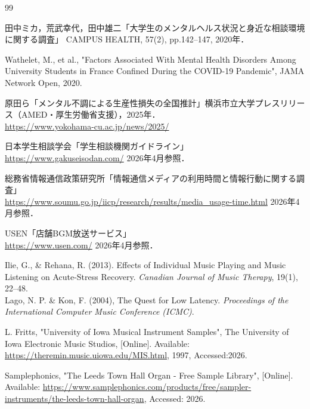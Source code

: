 \documentclass[lualatex,book,paper=a4paper,jafontsize=11.5pt,jafontscale=1.05]{jlreq}
\begin{document}
\begin{thebibliography}{99}

 田中ミカ，荒武幸代，田中雄二「大学生のメンタルヘルス状況と身近な相談環境に関する調査」
CAMPUS HEALTH, 57(2), pp.142--147, 2020年．

 Wathelet, M., et al., "Factors Associated With Mental Health Disorders Among University Students in France Confined During the COVID-19 Pandemic", JAMA Network Open, 2020.

 原田ら「メンタル不調による生産性損失の全国推計」横浜市立大学プレスリリース（AMED・厚生労働省支援），2025年．\\
\url{https://www.yokohama-cu.ac.jp/news/2025/}

 日本学生相談学会「学生相談機関ガイドライン」\\
\url{https://www.gakuseisodan.com/} 2026年4月参照．

 総務省情報通信政策研究所「情報通信メディアの利用時間と情報行動に関する調査」\\
\url{https://www.soumu.go.jp/iicp/research/results/media_usage-time.html} 2026年4月参照．

 USEN「店舗BGM放送サービス」\\
\url{https://www.usen.com/} 2026年4月参照．

 Ilie, G., \& Rehana, R. (2013). Effects of Individual Music Playing and Music Listening on Acute-Stress Recovery. \textit{Canadian Journal of Music Therapy}, 19(1), 22--48.\\

 Lago, N. P. \& Kon, F. (2004), The Quest for Low Latency. \textit{Proceedings of the International Computer Music Conference (ICMC)}.

 L. Fritts, "University of Iowa Musical Instrument Samples", The University of Iowa Electronic Music Studios, [Online]. Available: \url{https://theremin.music.uiowa.edu/MIS.html}, 1997, Accessed:2026.

 Samplephonics, "The Leeds Town Hall Organ - Free Sample Library", [Online]. Available: \url{https://www.samplephonics.com/products/free/sampler-instruments/the-leeds-town-hall-organ}, Accessed: 2026.


\end{thebibliography}
\end{document}
